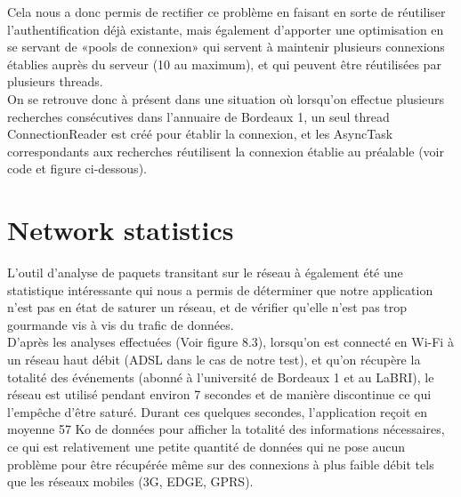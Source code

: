 Cela nous a donc permis de rectifier ce problème en faisant en sorte de réutiliser l’authentification déjà existante, mais également d’apporter une optimisation en se servant de «pools de connexion» qui servent à maintenir plusieurs connexions établies auprès du serveur (10 au maximum),  et qui peuvent être réutilisées par plusieurs threads.\\
On se retrouve donc à présent dans une situation où lorsqu’on effectue plusieurs recherches consécutives dans l’annuaire de Bordeaux 1, un seul thread ConnectionReader est créé pour établir la connexion, et les AsyncTask correspondants aux recherches réutilisent la connexion établie au préalable (voir code et figure ci-dessous).

\begin{figure}[h!]
  \label{fig:with_pool_code}
  \center
  \setlength\fboxsep{5pt}
  \setlength\fboxrule{0.5pt}
\end{figure}

\begin{figure}[h!]
  \label{fig:with_pool}
  \center
  \setlength\fboxsep{5pt}
  \setlength\fboxrule{0.5pt}
\end{figure}

\newpage

\section{Network statistics}
L’outil d’analyse de paquets transitant sur le réseau à également été une statistique intéressante qui nous a permis de déterminer que notre application n’est pas en état de saturer un réseau, et de vérifier qu’elle n’est pas trop gourmande vis à vis du trafic de données.\\
D’après les analyses effectuées (Voir figure 8.3), lorsqu’on est connecté en Wi-Fi à un réseau haut débit (ADSL dans le cas de notre test), et qu’on récupère la totalité des événements (abonné à l'université de Bordeaux 1 et au LaBRI), le réseau est utilisé pendant environ 7 secondes et de manière discontinue ce qui l’empêche d’être saturé. Durant ces quelques secondes, l’application reçoit en moyenne 57 Ko de données pour afficher la totalité des informations nécessaires, ce qui est relativement une petite quantité de données qui ne pose aucun problème pour être récupérée même sur des connexions à plus faible débit tels que les réseaux mobiles (3G, EDGE, GPRS). 

